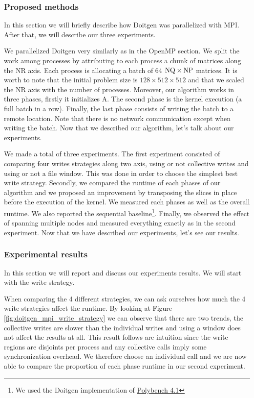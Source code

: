 
\subsubsection{Proposed methods}\label{proposed_methods_doitgenmpi}

In this section we will briefly describe how Doitgen was parallelized with MPI. After that, we will describe our three experiments.

We parallelized Doitgen very similarly as in the OpenMP section.
We split the work among processes by attributing to each process a chunk of matrices along the NR axis. Each process is allocating a batch of 64 ${\rm NQ}\times{\rm NP}$ matrices.
It is worth to note that the initial problem size is $128\times512\times512$ and that we scaled the NR axis with the number of processes. Moreover, our algorithm works in three phases, firstly it initializes A. The second phase is the kernel execution (a full batch in a row). Finally, the last phase consists of writing the batch to a remote location. Note that there is no network communication except when writing the batch. Now that we described our algorithm, let's talk about our experiments.

We made a total of three experiments. The first experiment consisted of comparing four writes strategies along two axis, using or not collective writes and using or not a file window. This was done in order to choose the simplest best write strategy. Secondly, we compared the runtime of each phases of our algorithm and we proposed an improvement by transposing the slices in place before the execution of the kernel. We measured each phases as well as the overall runtime. We also reported the sequential baseline\footnote{We used the Doitgen implementation of \href{https://web.cse.ohio-state.edu/~pouchet.2/software/polybench/}{Polybench 4.1} }. Finally, we observed the effect of spanning multiple nodes and measured everything exactly as in the second experiment. Now that we have described our experiments, let's see our results.

\subsubsection{Experimental results}\label{experimental_results_mpi}

In this section we will report and discuss our experiments results. We will start with the write strategy.

When comparing the 4 different strategies, we can ask ourselves how much the 4 write strategies affect the runtime. By looking at Figure \ref{fig:doitgen_mpi_write_strategy} we can observe that there are two trends, the collective writes are slower than the individual writes and using a window does not affect the results at all. This result follows are intuition since the write regions are disjoints per process and any collective calls imply some synchronization overhead. We therefore choose an individual call and we are now able to compare the proportion of each phase runtime in our second experiment.



